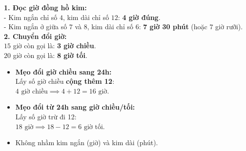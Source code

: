 \documentclass[11pt,a4paper]{article}
\begin{document}
\vspace{-1.5mm}
\noindent
\begin{minipage}[t]{0.49\textwidth}\vspace{0pt}
\begin{tcolorbox}[
  enhanced,
  colback=green!4!white,
  colframe=green!60!black,
  arc=2mm, boxrule=0.8pt,
  left=2mm, right=2mm, top=1.8mm, bottom=1.8mm,
  title={\footnotesize\bfseries\color{white}\faCheckCircle\ 4. Ví dụ thực hành chuẩn mực}
]
{\footnotesize
\textbf{1. Đọc giờ đồng hồ kim:}\\
- Kim ngắn chỉ số $4$, kim dài chỉ số $12$: \textbf{4 giờ đúng}.\\
- Kim ngắn ở giữa số $7$ và $8$, kim dài chỉ số $6$: \textbf{7 giờ 30 phút} (hoặc $7$ giờ rưỡi).
\textbf{2. Chuyển đổi giờ:}\\
$15$ giờ còn gọi là: \textbf{3 giờ chiều}.\\
$20$ giờ còn gọi là: \textbf{8 giờ tối}.
}
\end{tcolorbox}
\end{minipage}
\hfill
\begin{minipage}[t]{0.49\textwidth}\vspace{0pt}
\begin{tcolorbox}[
  enhanced,
  colback=red!4!white,
  colframe=red!75!black,
  arc=2mm, boxrule=0.8pt,
  left=2mm, right=2mm, top=1.8mm, bottom=1.8mm,
  title={\footnotesize\bfseries\color{white}\faExclamationTriangle\ 5. Mẹo tránh bẫy trắc nghiệm}
]
{\footnotesize
\begin{itemize}\setlength{\itemsep}{1pt}\setlength{\leftskip}{-2.5mm}
  \item \textbf{Mẹo đổi giờ chiều sang 24h:}\\
  Lấy số giờ chiều \textbf{cộng thêm 12}:\\
  $4\text{ giờ chiều} \implies 4 + 12 = 16\text{ giờ}$.
  \item \textbf{Mẹo đổi từ 24h sang giờ chiều/tối:}\\
  Lấy số giờ trừ đi 12:\\
  $18\text{ giờ} \implies 18 - 12 = 6\text{ giờ tối}$.
  \item Không nhầm kim ngắn (giờ) và kim dài (phút).
\end{itemize}
}
\end{tcolorbox}
\end{minipage}
\end{document}
